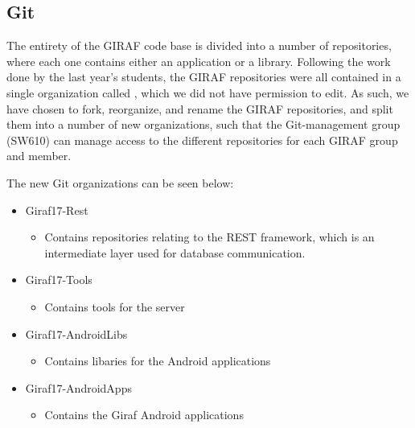 \subsection{Git}\label{GitTool}
The entirety of the GIRAF code base is divided into a number of repositories,
where each one contains either an application or a library. Following the work
done by the last year's students, the GIRAF repositories  were all contained in
a single organization called , which we did not have permission to
edit. As such, we have chosen to fork, reorganize, and rename the GIRAF
repositories, and split them into a number of new organizations, such that the
Git-management group (SW610) can manage access to the different repositories
for each GIRAF group and member.



The new Git organizations can be seen below:
\begin{itemize}
	\item Giraf17-Rest
	\begin{itemize}
  		\item Contains repositories relating to the REST framework, which is an
  		intermediate layer used for database communication.
	\end{itemize}
  	\item Giraf17-Tools
  	\begin{itemize}
  		\item Contains tools for the server
	\end{itemize}
  	\item Giraf17-AndroidLibs
  	\begin{itemize}
  		\item Contains libaries for the Android applications
	\end{itemize}
  	\item Giraf17-AndroidApps
  	\begin{itemize}
  		\item Contains the Giraf Android applications 
	\end{itemize}
\end{itemize}